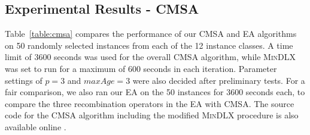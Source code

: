 \documentclass[a4paper,11pt,authoryear]{elsarticle}
\begin{document}
\subsection{Experimental Results - CMSA}
\label{sub:expcmsa}
\noindent Table~\ref{table:cmsa} compares the performance of our CMSA and EA algorithms on 50 randomly selected instances from each of the 12 instance classes. A time limit of 3600 seconds was used for the overall CMSA algorithm, while \textsc{MinDLX} was set to run for a maximum of 600 seconds in each iteration. Parameter settings of $p = 3$ and $maxAge = 3$ were also decided after preliminary tests. For a fair comparison, we also ran our EA on the 50 instances for 3600 seconds each, to compare the three recombination operators in the EA with CMSA. The source code for the CMSA algorithm including the modified \textsc{MinDLX} procedure is also available online \citep{hawa2019cmsa}.
\end{document}
